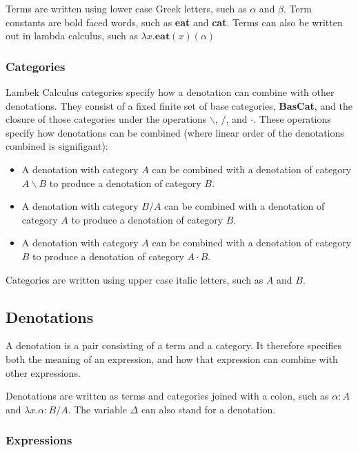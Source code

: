 \documentclass[11pt]{article}
\begin{document}
Terms are written using lower case Greek letters, such as $\alpha$ and
$\beta$.  Term constants are bold faced words, such as \textbf{eat} and
\textbf{cat}.  Terms can also be written out in lambda calculus, such
as $\lambda x.\textbf{eat}(x)(\alpha)$

\newpage
\subsubsection{Categories}
Lambek Calculus categories specify how a denotation can combine with
other denotations.  They consist of a fixed finite set of base
categories, \textbf{BasCat}, and the closure of those categories under
the operations $\backslash$, $/$, and $\cdot$.  These operations specify how
denotations can be combined (where linear order of the denotations
combined is signifigant):

\begin{itemize}
  \item A denotation with category $A$ can be combined with a
  denotation of category $A \backslash B$ to produce a denotation of category
  $B$.
  \item A denotation with category $B / A$ can be combined with a
  denotation of category $A$ to produce a denotation of category $B$.
  \item A denotation with category $A$ can be combined with a
  denotation of category $B$ to produce a denotation of category
  $A \cdot B$.
\end{itemize}

Categories are written using upper case italic letters, such as $A$
and $B$.

\subsection{Denotations}

A denotation is a pair consisting of a term and a category.  It
therefore specifies both the meaning of an expression, and how that
expression can combine with other expressions.  

Denotations are written as terms and categories joined with a colon,
such as $\alpha:A$ and $\lambda x.\alpha:B/A$.  The variable $\Delta$ can also stand
for a denotation.

\subsubsection{Expressions}
\end{document}
